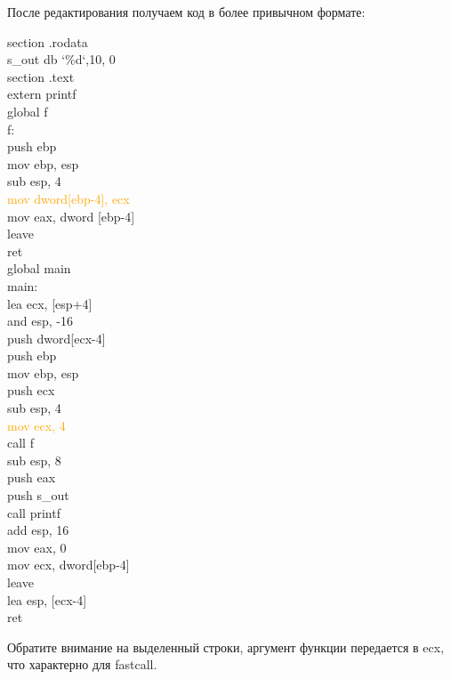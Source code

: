 \documentclass[12pt, letterpaper]{article}
\begin{document}
После редактирования получаем код в более привычном формате:\\
\begin{minipage}{0.5\textwidth}
\setlength{\parindent}{1pc}
\noindent section .rodata\\
    \indent s\_out db `\%d`,10, 0\\
section .text\\
extern printf\\
global	f\\
f:\\
    \indent push	ebp\\
    \indent mov	ebp, esp\\
    \indent sub	esp, 4\\
    \indent \textcolor{orange}{mov	dword[ebp-4], ecx}\\
    \indent mov	eax, dword [ebp-4]\\
    \indent leave\\
    \indent ret\\
global	main\\
main:\\
    \indent lea	ecx, [esp+4]\\
    \indent and	esp, -16\\
    \indent push	dword[ecx-4]\\
    \indent push	ebp\\
    \indent mov	ebp, esp\\
    \indent push	ecx\\
    \indent sub	esp, 4\\
    \indent \textcolor{orange}{mov	ecx, 4}\\
    \indent call	f\\
    \indent sub	esp, 8\\
    \indent push	eax\\
    \indent push	s\_out\\
    \indent call	printf\\
    \indent add	esp, 16\\
    \indent mov	eax, 0\\
    \indent mov	ecx, dword[ebp-4]\\
    \indent leave\\
    \indent lea	esp, [ecx-4]\\
    \indent ret\\
\end{minipage}
\begin{minipage}{0.5\textwidth}
    Обратите внимание на выделенный строки, аргумент функции передается в ecx, что характерно для fastcall.
\end{minipage}
\newpage
\end{document}
